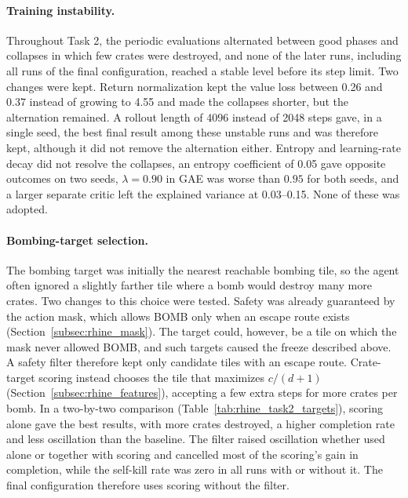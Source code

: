 \documentclass[11pt,a4paper]{report}
\begin{document}
	\paragraph{Training instability.} Throughout Task 2, the periodic evaluations alternated between good phases and collapses in which few crates were destroyed, and none of the later runs, including all runs of the final configuration, reached a stable level before its step limit. Two changes were kept. Return normalization kept the value loss between 0.26 and 0.37 instead of growing to 4.55 and made the collapses shorter, but the alternation remained. A rollout length of 4096 instead of 2048 steps gave, in a single seed, the best final result among these unstable runs and was therefore kept, although it did not remove the alternation either. Entropy and learning-rate decay did not resolve the collapses, an entropy coefficient of 0.05 gave opposite outcomes on two seeds, $\lambda = 0.90$ in GAE was worse than $0.95$ for both seeds, and a larger separate critic left the explained variance at 0.03--0.15. None of these was adopted.
	
	\paragraph{Bombing-target selection.} The bombing target was initially the nearest reachable bombing tile, so the agent often ignored a slightly farther tile where a bomb would destroy many more crates. Two changes to this choice were tested. Safety was already guaranteed by the action mask, which allows BOMB only when an escape route exists (Section~\ref{subsec:rhine_mask}). The target could, however, be a tile on which the mask never allowed BOMB, and such targets caused the freeze described above. A safety filter therefore kept only candidate tiles with an escape route. Crate-target scoring instead chooses the tile that maximizes $c/(d+1)$ (Section~\ref{subsec:rhine_features}), accepting a few extra steps for more crates per bomb. In a two-by-two comparison (Table~\ref{tab:rhine_task2_targets}), scoring alone gave the best results, with more crates destroyed, a higher completion rate and less oscillation than the baseline. The filter raised oscillation whether used alone or together with scoring and cancelled most of the scoring's gain in completion, while the self-kill rate was zero in all runs with or without it. The final configuration therefore uses scoring without the filter.
	
\end{document}

